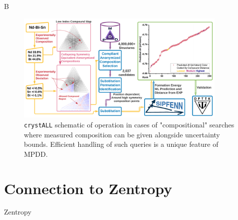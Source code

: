B

\begin{figure}[h]
    \centering
    \includegraphics[width=0.9\textwidth]{crystall/crystALL_composition_diagram_V3.png}
    \caption{\texttt{crystALL} schematic of operation in cases of "compositional" searches where measured composition can be given alongside uncertainty bounds. Efficient handling of such queries is a unique feature of MPDD.}
    \label{fig:crystallcomposition}
\end{figure}

\section{Connection to Zentropy} \label{sec:crystallzentropy}

Zentropy


\printbibliography[heading=subbibintoc]